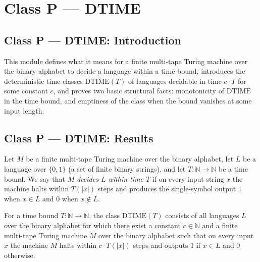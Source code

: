 \section{Class P --- DTIME}
\subsection*{Class P --- DTIME: Introduction}

This module defines what it means for a finite multi-tape Turing machine over the
binary alphabet to decide a language within a time bound, introduces the deterministic
time classes $\mathrm{DTIME}(T)$ of languages decidable in time $c \cdot T$ for some
constant $c$, and proves two basic structural facts: monotonicity of
$\mathrm{DTIME}$ in the time bound, and emptiness of the class when the bound vanishes
at some input length.

\subsection*{Class P --- DTIME: Results}

\begin{definition}
\label{Turing.FinTM.DecidesInTime}
\leanok
{}
Let $M$ be a finite multi-tape Turing machine over the binary alphabet, let $L$ be a
language over $\{0,1\}$ (a set of finite binary strings), and let
$T : \mathbb{N} \to \mathbb{N}$ be a time bound. We say that $M$ \emph{decides $L$
within time $T$} if on every input string $x$ the machine halts within $T(|x|)$ steps
and produces the single-symbol output $1$ when $x \in L$ and $0$ when $x \notin L$.
\end{definition}

\begin{definition}
\label{Complexity.DTIME}
\leanok
{}
For a time bound $T : \mathbb{N} \to \mathbb{N}$, the class $\mathrm{DTIME}(T)$
consists of all languages $L$ over the binary alphabet for which there exist a
constant $c \in \mathbb{N}$ and a finite multi-tape Turing machine $M$ over the binary
alphabet such that on every input $x$ the machine $M$ halts within $c \cdot T(|x|)$
steps and outputs $1$ if $x \in L$ and $0$ otherwise.
\end{definition}

